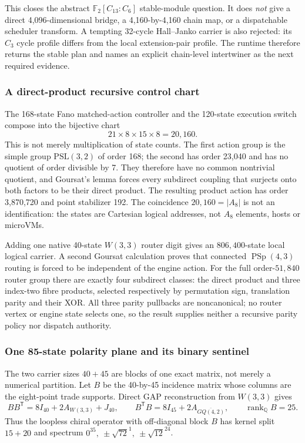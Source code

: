 \documentclass[11pt,letterpaper]{article}
\newcommand{\tagbox}[3]{\tikz[baseline=(X.base)]{\node[inner xsep=3.5pt,inner ysep=1.4pt,rounded corners=1.6pt,fill=#1,text=#2,font=\bfseries\sffamily\tiny] (X) {#3};}}
\newcommand{\PROVED}{\tagbox{greenlite}{green!45!black}{PROVED}}
\newcommand{\W}{\ensuremath{W(3,3)}}
\begin{document}
This closes the abstract $\mathbb F_2[C_{13}{:}C_6]$ stable-module question.
It does \emph{not} give a direct 4,096-dimensional bridge, a 4,160-by-4,160
chain map, or a dispatchable scheduler transform. A tempting 32-cycle
Hall--Janko carrier is also rejected: its $C_3$ cycle profile differs from the
local extension-pair profile. The runtime therefore returns the stable plan
and names an explicit chain-level intertwiner as the next required evidence.

\subsubsection{A direct-product recursive control chart}

The 168-state Fano matched-action controller and the 120-state execution switch
compose into the bijective chart
\[
 21\times8\times15\times8=20{,}160.
\]
This is not merely multiplication of state counts. The first action group is
the simple group $\mathrm{PSL}(3,2)$ of order 168; the second has order 23,040
and has no quotient of order divisible by 7. They therefore have no common
nontrivial quotient, and Goursat's lemma forces every subdirect coupling that
surjects onto both factors to be their direct product. The resulting product
action has order 3,870,720 and point stabilizer 192. The coincidence
$20{,}160=|A_8|$ is not an identification: the states are Cartesian logical
addresses, not $A_8$ elements, hosts or microVMs. \PROVED

Adding one native 40-state \W{} router digit gives an $806{,}400$-state local
logical carrier. A second Goursat calculation proves that connected
$\operatorname{PSp}(4,3)$ routing is forced to be independent of the engine
action. For the full order-$51{,}840$ router group there are exactly four
subdirect classes: the direct product and three index-two fibre products,
selected respectively by permutation sign, translation parity and their XOR.
All three parity pullbacks are noncanonical; no router vertex or engine state
selects one, so the result supplies neither a recursive parity policy nor
dispatch authority. \PROVED

\subsubsection{One 85-state polarity plane and its binary sentinel}

The two carrier sizes $40+45$ are blocks of one exact matrix, not merely a
numerical partition. Let $B$ be the 40-by-45 incidence matrix whose columns are
the eight-point trade supports. Direct GAP reconstruction from \W{} gives
\[
 BB^{\mathsf T}=8I_{40}+2A_{\W}+J_{40},\qquad
 B^{\mathsf T}B=8I_{45}+2A_{\overline{GQ(4,2)}},
 \qquad \operatorname{rank}_{\mathbb Q}B=25.
\]
Thus the loopless chiral operator with off-diagonal block $B$ has kernel split
$15+20$ and spectrum
$0^{35},\ \pm\sqrt{72}^{1},\ \pm\sqrt{12}^{24}$. \PROVED
\end{document}
